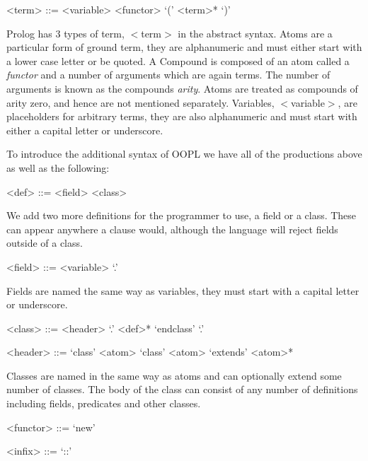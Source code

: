 \documentclass[12pt,a4paper,twoside,openright]{report}
\begin{document}
\begin{grammar}	
				
<term> ::= <variable>
\alt <functor> `(' <term>* `)'

\end{grammar}

Prolog has 3 types of term,  $<$term$>$ in the abstract syntax. Atoms are a particular form of ground term, they are alphanumeric and must either start with a lower case letter or be quoted. A Compound is composed of an atom called a \emph{functor} and a number of arguments which are again terms. The number of arguments is known as the compounds \emph{arity}. Atoms are treated as compounds of arity zero, and hence are not mentioned separately. Variables, $<$variable$>$, are placeholders for arbitrary terms, they are also alphanumeric and must start with either a capital letter or underscore.

\bigskip

To introduce the additional syntax of OOPL we have all of the productions above as well as the following:

\begin{grammar}
<def> ::= <field>
\alt <class>
\end{grammar}

We add two more definitions for the programmer to use, a field or a class. These can appear anywhere a clause would, although the language will reject fields outside of a class.

\begin{grammar}
<field> ::= <variable> `.'
\end{grammar}

Fields are named the same way as variables, they must start with a capital letter or underscore.

\begin{grammar}
<class> ::= <header> `.' <def>* `endclass' `.'

<header> ::= `class' <atom>
\alt `class' <atom> `extends' <atom>*
\end{grammar}

Classes are named in the same way as atoms and can optionally extend some number of classes. The body of the class can consist of any number of definitions including fields, predicates and other classes. 

\begin{grammar}
<functor> ::= `new'

<infix> ::= `::'
\end{grammar}
\end{document}
